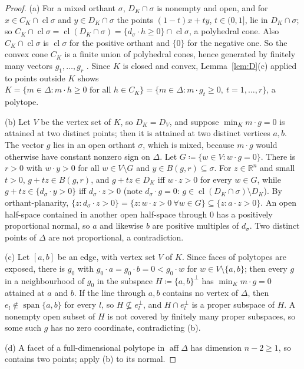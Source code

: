 \documentclass[11pt]{article}
\newcommand{\R}{\mathbb{R}}
\DeclareMathOperator{\aff}{aff}
\DeclareMathOperator{\cl}{cl}
\DeclareMathOperator{\spn}{span}
\theoremstyle{plain}
\theoremstyle{definition}
\theoremstyle{remark}
\begin{document}
\begin{proof}
(a) For a mixed orthant $\sigma$, $D_K\cap\sigma$ is nonempty and open, and for $x\in C_K
\cap\cl\sigma$ and $y\in D_K\cap\sigma$ the points $(1-t)x+ty$, $t\in(0,1]$, lie in
$D_K\cap\sigma$; so $C_K\cap\cl\sigma=\cl(D_K\cap\sigma)=\{d_\sigma\cdot h\ge0\}\cap
\cl\sigma$, a polyhedral cone. Also $C_K\cap\cl\sigma$ is $\cl\sigma$ for the positive
orthant and $\{0\}$ for the negative one. So the convex cone $C_K$ is a finite union of
polyhedral cones, hence generated by finitely many vectors $g_1,\dots,g_r$
\cite[Cor.~7.1a]{Schrijver}. Since $K$ is closed and convex, Lemma~\ref{lem:D}(c) applied
to points outside $K$ shows $K=\{m\in\Delta:m\cdot h\ge0\text{ for all }h\in C_K\}=
\{m\in\Delta:m\cdot g_t\ge0,\ t=1,\dots,r\}$, a polytope.

(b) Let $V$ be the vertex set of $K$, so $D_K=D_V$, and suppose $\min_Km\cdot g=0$ is
attained at two distinct points; then it is attained at two distinct vertices $a,b$. The
vector $g$ lies in an open orthant $\sigma$, which is mixed, because $m\cdot g$ would
otherwise have constant nonzero sign on $\Delta$. Let $G\coloneqq\{w\in V:w\cdot g=0\}$.
There is $r>0$ with $w\cdot y>0$ for all $w\in V\setminus G$ and $y\in B(g,r)\subseteq
\sigma$. For $z\in\R^n$ and small $t>0$, $g+tz\in B(g,r)$, and $g+tz\in D_K$ iff $w\cdot
z>0$ for every $w\in G$, while $g+tz\in\{d_\sigma\cdot y>0\}$ iff $d_\sigma\cdot z>0$ (note
$d_\sigma\cdot g=0$: $g\in\cl(D_K\cap\sigma)\setminus D_K$). By orthant-planarity,
$\{z:d_\sigma\cdot z>0\}=\{z:w\cdot z>0\ \forall w\in G\}\subseteq\{z:a\cdot z>0\}$. An
open half-space contained in another open half-space through $0$ has a positively
proportional normal, so $a$ and likewise $b$ are positive multiples of $d_\sigma$. Two
distinct points of $\Delta$ are not proportional, a contradiction.

(c) Let $[a,b]$ be an edge, with vertex set $V$ of $K$. Since faces of polytopes are
exposed, there is $g_0$ with $g_0\cdot a=g_0\cdot b=0<g_0\cdot w$ for $w\in V\setminus
\{a,b\}$; then every $g$ in a neighbourhood of $g_0$ in the subspace $H\coloneqq\{a,b\}^
\perp$ has $\min_Km\cdot g=0$ attained at $a$ and $b$. If the line through $a,b$ contains
no vertex of $\Delta$, then $e_l\notin\spn\{a,b\}$ for every $l$, so $H\not\subseteq
e_l^\perp$, and $H\cap e_l^\perp$ is a proper subspace of $H$. A nonempty open subset of
$H$ is not covered by finitely many proper subspaces, so some such $g$ has no zero
coordinate, contradicting (b).

(d) A facet of a full-dimensional polytope in $\aff\Delta$ has dimension $n-2\ge1$, so
contains two points; apply (b) to its normal.
\end{proof}
\end{document}
